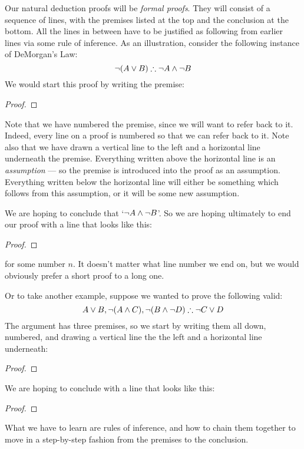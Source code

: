 Our natural deduction proofs will be \emph{formal proofs}.  They will consist of a sequence of lines, with the premises  listed at the top and the conclusion at the bottom.  All the lines in between have to be justified as following from earlier lines via some rule of inference. As an illustration, consider the following instance of DeMorgan's Law:
	$$\neg (A \vee B) \therefore \neg A \wedge \neg B$$
We would start this proof by writing the premise:
\begin{proof}
\end{proof}
Note that we have numbered the premise, since we will want to refer back to it. Indeed, every line on a proof is numbered so that we can refer back to it.  Note also that we have drawn a vertical line to the left and a horizontal line underneath the premise. Everything written above the horizontal line is an \emph{assumption} --- so the premise is introduced into the proof as an assumption. Everything written below the horizontal line will either be something which follows from this assumption, or it will be some new assumption. 

We are hoping to conclude that `$\neg A \wedge \neg B$'.  So we are hoping ultimately to end our proof with a line that looks like this:
\begin{proof}
\end{proof}
for some number $n$. It doesn't matter what line number we end on, but we would obviously prefer a short proof to a long one.

Or to take another example, suppose we wanted to prove the following valid:
$$A\vee B, \neg (A\wedge C), \neg (B \wedge \neg D) \therefore \neg C\vee D$$
The argument has three premises, so we start by writing them all down, numbered, and drawing a vertical line the the left and a horizontal line underneath:
\begin{proof}
\end{proof}
We are hoping to conclude with a line that looks like this:
\begin{proof}
\end{proof}
What we have to learn are rules of inference, and how to chain them together to move in a step-by-step fashion from the premises to the conclusion.

